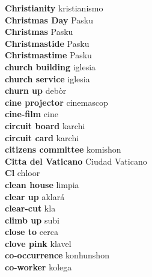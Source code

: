 \textbf{ Christianity  } kristianismo \\
\textbf{ Christmas Day  } Pasku \\
\textbf{ Christmas  } Pasku \\
\textbf{ Christmastide  } Pasku \\
\textbf{ Christmastime  } Pasku \\
\textbf{ church building  } iglesia \\
\textbf{ church service  } iglesia \\
\textbf{ churn up  } debòr \\
\textbf{ cine projector  } cinemascop \\
\textbf{ cine-film  } cine \\
\textbf{ circuit board  } karchi \\
\textbf{ circuit card  } karchi \\
\textbf{ citizens committee  } komishon \\
\textbf{ Citta del Vaticano  } Ciudad Vaticano \\
\textbf{ Cl  } chloor \\
\textbf{ clean house  } limpia \\
\textbf{ clear up  } aklará \\
\textbf{ clear-cut  } kla \\
\textbf{ climb up  } subi \\
\textbf{ close to  } cerca \\
\textbf{ clove pink  } klavel \\
\textbf{ co-occurrence  } konhunshon \\
\textbf{ co-worker  } kolega \\
